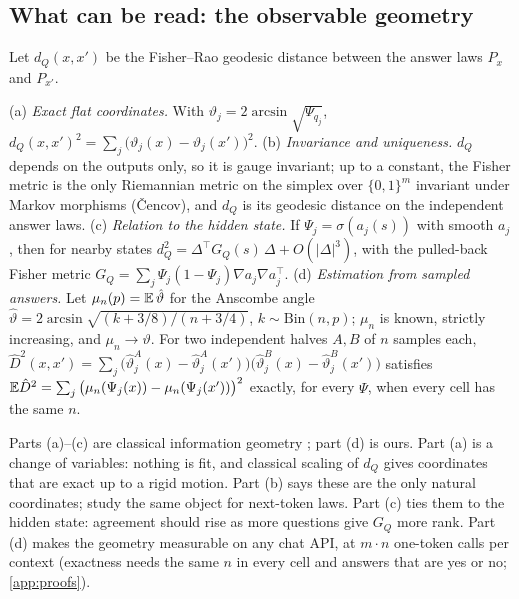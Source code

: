 \subsection{What can be read: the observable geometry}
Let $d_Q(x,x')$ be the Fisher--Rao geodesic distance between the answer laws $P_x$ and $P_{x'}$.
\begin{theorem}\label{thm:geometry}
(a) \emph{Exact flat coordinates.} With $\vartheta_j=2\arcsin\sqrt{\Psi_{q_j}}$, $d_Q(x,x')^2=\sum_j\big(\vartheta_j(x)-\vartheta_j(x')\big)^2$.
(b) \emph{Invariance and uniqueness.} $d_Q$ depends on the outputs only, so it is gauge invariant; up to a constant, the Fisher metric is the only Riemannian metric on the simplex over $\{0,1\}^m$ invariant under Markov morphisms (\v{C}encov), and $d_Q$ is its geodesic distance on the independent answer laws.
(c) \emph{Relation to the hidden state.} If $\Psi_j=\sigma(a_j(s))$ with smooth $a_j$, then for nearby states $d_Q^2=\Delta^{\top}G_Q(s)\,\Delta+O(|\Delta|^3)$, with the pulled-back Fisher metric $G_Q=\sum_j\Psi_j(1-\Psi_j)\nabla a_j\nabla a_j^{\top}$.
(d) \emph{Estimation from sampled answers.} Let $\mu_n(p)=\mathbb{E}\,\hat\vartheta$ for the Anscombe angle $\hat\vartheta=2\arcsin\sqrt{(k+3/8)/(n+3/4)}$, $k\sim\mathrm{Bin}(n,p)$; $\mu_n$ is known, strictly increasing, and $\mu_n\to\vartheta$. For two independent halves $A,B$ of $n$ samples each, $\hat D^2(x,x')=\sum_j\big(\hat\vartheta^A_j(x)-\hat\vartheta^A_j(x')\big)\big(\hat\vartheta^B_j(x)-\hat\vartheta^B_j(x')\big)$ satisfies $\mathbb{E}\hat D^2=\sum_j\big(\mu_n(\Psi_j(x))-\mu_n(\Psi_j(x'))\big)^2$ exactly, for every $\Psi$, when every cell has the same $n$.
\end{theorem}
Parts (a)--(c) are classical information geometry \citep{amari2016information}; part (d) is ours. Part (a) is a change of variables: nothing is fit, and classical scaling of $d_Q$ gives coordinates that are exact up to a rigid motion. Part (b) says these are the only natural coordinates; \citet{picozzi2026information} study the same object for next-token laws. Part (c) ties them to the hidden state: agreement should rise as more questions give $G_Q$ more rank. Part (d) makes the geometry measurable on any chat API, at $m\cdot n$ one-token calls per context (exactness needs the same $n$ in every cell and answers that are yes or no; \cref{app:proofs}).

